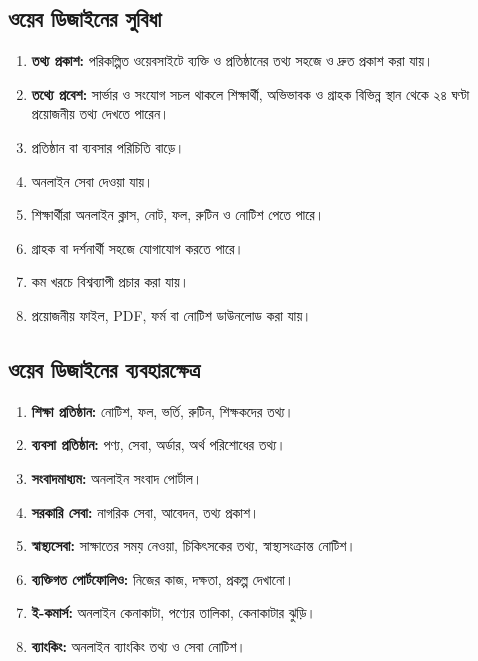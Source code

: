 \par\noindent
\begin{minipage}[t]{.48\linewidth}\vspace{0pt}
\subsection{ওয়েব ডিজাইনের সুবিধা}

\begin{enumerate}
\item \textbf{তথ্য প্রকাশ:} পরিকল্পিত ওয়েবসাইটে ব্যক্তি ও প্রতিষ্ঠানের তথ্য সহজে ও দ্রুত প্রকাশ করা যায়।
\item \textbf{তথ্যে প্রবেশ:} সার্ভার ও সংযোগ সচল থাকলে শিক্ষার্থী, অভিভাবক ও গ্রাহক বিভিন্ন স্থান থেকে ২৪ ঘণ্টা প্রয়োজনীয় তথ্য দেখতে পারেন।
\item প্রতিষ্ঠান বা ব্যবসার পরিচিতি বাড়ে।
\item অনলাইন সেবা দেওয়া যায়।
\item শিক্ষার্থীরা অনলাইন ক্লাস, নোট, ফল, রুটিন ও নোটিশ পেতে পারে।
\item গ্রাহক বা দর্শনার্থী সহজে যোগাযোগ করতে পারে।
\item কম খরচে বিশ্বব্যাপী প্রচার করা যায়।
\item প্রয়োজনীয় ফাইল, PDF, ফর্ম বা নোটিশ ডাউনলোড করা যায়।
\end{enumerate}
\end{minipage}\hfill
\begin{minipage}[t]{.48\linewidth}\vspace{0pt}
\subsection{ওয়েব ডিজাইনের ব্যবহারক্ষেত্র}

\begin{enumerate}
\item \textbf{শিক্ষা প্রতিষ্ঠান:} নোটিশ, ফল, ভর্তি, রুটিন, শিক্ষকদের তথ্য।
\item \textbf{ব্যবসা প্রতিষ্ঠান:} পণ্য, সেবা, অর্ডার, অর্থ পরিশোধের তথ্য।
\item \textbf{সংবাদমাধ্যম:} অনলাইন সংবাদ পোর্টাল।
\item \textbf{সরকারি সেবা:} নাগরিক সেবা, আবেদন, তথ্য প্রকাশ।
\item \textbf{স্বাস্থ্যসেবা:} সাক্ষাতের সময় নেওয়া, চিকিৎসকের তথ্য, স্বাস্থ্যসংক্রান্ত নোটিশ।
\item \textbf{ব্যক্তিগত পোর্টফোলিও:} নিজের কাজ, দক্ষতা, প্রকল্প দেখানো।
\item \textbf{ই-কমার্স:} অনলাইন কেনাকাটা, পণ্যের তালিকা, কেনাকাটার ঝুড়ি।
\item \textbf{ব্যাংকিং:} অনলাইন ব্যাংকিং তথ্য ও সেবা নোটিশ।
\end{enumerate}
\end{minipage}\par\smallskip
